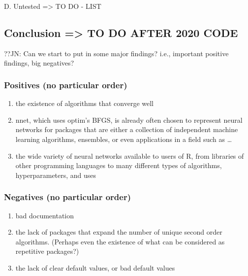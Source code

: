 D. Untested =\textgreater{} TO DO - LIST

\hypertarget{conclusion-to-do-after-2020-code}{%
\subsection{Conclusion =\textgreater{} TO DO AFTER 2020
CODE}\label{conclusion-to-do-after-2020-code}}

??JN: Can we start to put in some major findings? i.e., important
positive findings, big negatives?

\hypertarget{positives-no-particular-order}{%
\subsubsection{Positives (no particular
order)}\label{positives-no-particular-order}}

\begin{enumerate}
\def\labelenumi{\arabic{enumi}.}
\tightlist
\item
  the existence of algorithms that converge well
\item
  nnet, which uses optim's BFGS, is already often chosen to represent
  neural networks for packages that are either a collection of
  independent machine learning algorithms, ensembles, or even
  applications in a field such as \ldots{}
\item
  the wide variety of neural networks available to users of R, from
  libraries of other programming languages to many different types of
  algorithms, hyperparameters, and uses
\end{enumerate}

\hypertarget{negatives-no-particular-order}{%
\subsubsection{Negatives (no particular
order)}\label{negatives-no-particular-order}}

\begin{enumerate}
\def\labelenumi{\arabic{enumi}.}
\tightlist
\item
  bad documentation
\item
  the lack of packages that expand the number of unique second order
  algorithms. (Perhaps even the existence of what can be considered as
  repetitive packages?)
\item
  the lack of clear default values, or bad default values
\end{enumerate}

